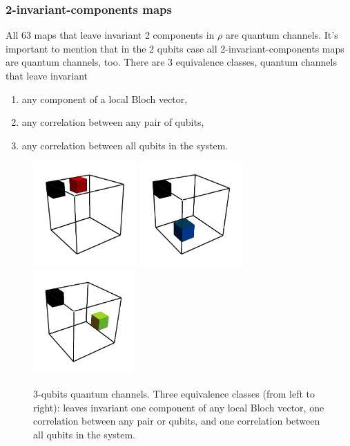 \documentclass[11pt,dvipsnames]{article} %
\newcommand{\1}{\mathds{1}}
\begin{document}
\subsubsection*{2-invariant-components maps}
All 63 maps that leave invariant 2 components in $\rho$ are 
quantum channels. It's important to mention that in the 2 qubits case all 
2-invariant-components maps are quantum channels, too. There are
3 equivalence classes, quantum channels that leave invariant
\begin{enumerate}
	\item any component of a local Bloch vector,
	\item any correlation between any pair of qubits,
	\item any correlation between all qubits in the system.
\end{enumerate}
\begin{figure}[H]
	\centering
	\hfill \hfill
	\includegraphics[height=4cm]{img/3q-2c-1}
	\hfill
	\includegraphics[height=4cm]{img/3q-2c-2}
	\hfill
	\includegraphics[height=4cm]{img/3q-2c-3}
	\hfill \hfill
	\caption{3-qubits quantum channels. Three equivalence classes 
	(from left to right): leaves invariant one component of any local
	Bloch vector, one correlation between any pair or qubits, and 
	one correlation between all qubits in the system.}
\end{figure}
\end{document}
